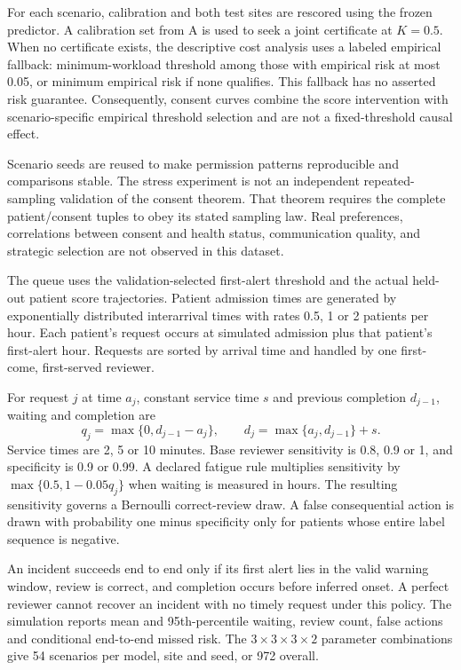 For each scenario, calibration and both test sites are rescored using the frozen predictor. A calibration set from A is used to seek a joint certificate at $K=0.5$. When no certificate exists, the descriptive cost analysis uses a labeled empirical fallback: minimum-workload threshold among those with empirical risk at most 0.05, or minimum empirical risk if none qualifies. This fallback has no asserted risk guarantee. Consequently, consent curves combine the score intervention with scenario-specific empirical threshold selection and are not a fixed-threshold causal effect.

Scenario seeds are reused to make permission patterns reproducible and comparisons stable. The stress experiment is not an independent repeated-sampling validation of the consent theorem. That theorem requires the complete patient/consent tuples to obey its stated sampling law. Real preferences, correlations between consent and health status, communication quality, and strategic selection are not observed in this dataset.

The queue uses the validation-selected first-alert threshold and the actual held-out patient score trajectories. Patient admission times are generated by exponentially distributed interarrival times with rates 0.5, 1 or 2 patients per hour. Each patient's request occurs at simulated admission plus that patient's first-alert hour. Requests are sorted by arrival time and handled by one first-come, first-served reviewer.

For request $j$ at time $a_j$, constant service time $s$ and previous completion $d_{j-1}$, waiting and completion are
\begin{equation*}
 q_j=\max\{0,d_{j-1}-a_j\},\qquad
 d_j=\max\{a_j,d_{j-1}\}+s.
\end{equation*}
Service times are 2, 5 or 10 minutes. Base reviewer sensitivity is 0.8, 0.9 or 1, and specificity is 0.9 or 0.99. A declared fatigue rule multiplies sensitivity by $\max\{0.5,1-0.05q_j\}$ when waiting is measured in hours. The resulting sensitivity governs a Bernoulli correct-review draw. A false consequential action is drawn with probability one minus specificity only for patients whose entire label sequence is negative.

An incident succeeds end to end only if its first alert lies in the valid warning window, review is correct, and completion occurs before inferred onset. A perfect reviewer cannot recover an incident with no timely request under this policy. The simulation reports mean and 95th-percentile waiting, review count, false actions and conditional end-to-end missed risk. The $3\times3\times3\times2$ parameter combinations give 54 scenarios per model, site and seed, or 972 overall.

